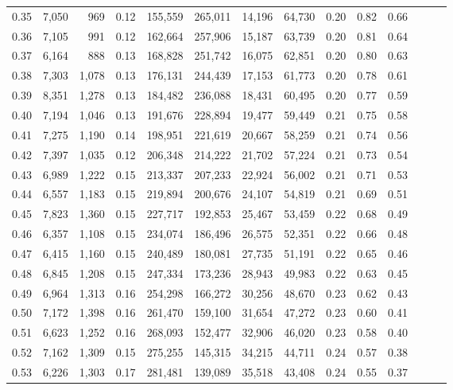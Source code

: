 \begin{tabular}{rrrrrrrrrrrrrr}
0.35 &  7,050 &    969 &  0.12 &  155,559 &  265,011 &  14,196 &  64,730 &  0.20 &  0.82 &      0.66 \\
0.36 &  7,105 &    991 &  0.12 &  162,664 &  257,906 &  15,187 &  63,739 &  0.20 &  0.81 &      0.64 \\
0.37 &  6,164 &    888 &  0.13 &  168,828 &  251,742 &  16,075 &  62,851 &  0.20 &  0.80 &      0.63 \\
0.38 &  7,303 &  1,078 &  0.13 &  176,131 &  244,439 &  17,153 &  61,773 &  0.20 &  0.78 &      0.61 \\
0.39 &  8,351 &  1,278 &  0.13 &  184,482 &  236,088 &  18,431 &  60,495 &  0.20 &  0.77 &      0.59 \\
0.40 &  7,194 &  1,046 &  0.13 &  191,676 &  228,894 &  19,477 &  59,449 &  0.21 &  0.75 &      0.58 \\
0.41 &  7,275 &  1,190 &  0.14 &  198,951 &  221,619 &  20,667 &  58,259 &  0.21 &  0.74 &      0.56 \\
0.42 &  7,397 &  1,035 &  0.12 &  206,348 &  214,222 &  21,702 &  57,224 &  0.21 &  0.73 &      0.54 \\
0.43 &  6,989 &  1,222 &  0.15 &  213,337 &  207,233 &  22,924 &  56,002 &  0.21 &  0.71 &      0.53 \\
0.44 &  6,557 &  1,183 &  0.15 &  219,894 &  200,676 &  24,107 &  54,819 &  0.21 &  0.69 &      0.51 \\
0.45 &  7,823 &  1,360 &  0.15 &  227,717 &  192,853 &  25,467 &  53,459 &  0.22 &  0.68 &      0.49 \\
0.46 &  6,357 &  1,108 &  0.15 &  234,074 &  186,496 &  26,575 &  52,351 &  0.22 &  0.66 &      0.48 \\
0.47 &  6,415 &  1,160 &  0.15 &  240,489 &  180,081 &  27,735 &  51,191 &  0.22 &  0.65 &      0.46 \\
0.48 &  6,845 &  1,208 &  0.15 &  247,334 &  173,236 &  28,943 &  49,983 &  0.22 &  0.63 &      0.45 \\
0.49 &  6,964 &  1,313 &  0.16 &  254,298 &  166,272 &  30,256 &  48,670 &  0.23 &  0.62 &      0.43 \\
0.50 &  7,172 &  1,398 &  0.16 &  261,470 &  159,100 &  31,654 &  47,272 &  0.23 &  0.60 &      0.41 \\
0.51 &  6,623 &  1,252 &  0.16 &  268,093 &  152,477 &  32,906 &  46,020 &  0.23 &  0.58 &      0.40 \\
0.52 &  7,162 &  1,309 &  0.15 &  275,255 &  145,315 &  34,215 &  44,711 &  0.24 &  0.57 &      0.38 \\
0.53 &  6,226 &  1,303 &  0.17 &  281,481 &  139,089 &  35,518 &  43,408 &  0.24 &  0.55 &      0.37 \\

\end{tabular}
